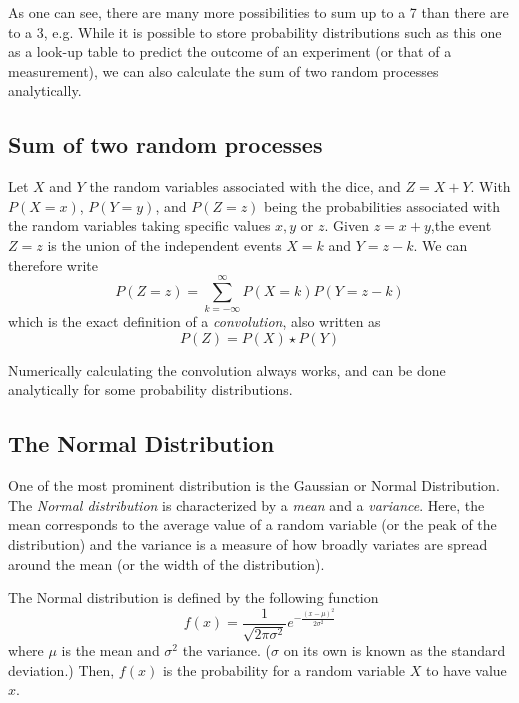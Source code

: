 As one can see, there are many more possibilities to sum up to a 7 than there are to a 3, e.g. While it is possible to store probability distributions such as this one as a look-up table to predict the outcome of an experiment (or that of a measurement), we can also calculate the sum of two random processes analytically. 

\subsection{Sum of two random processes}\label{sec:convolution}
Let $X$ and $Y$ the random variables associated with the dice, and $Z=X+Y$. With $P(X=x)$, $P(Y=y)$, and $P(Z=z)$ being the probabilities associated with the random variables taking specific values $x,y$ or $z$. Given $z=x+y$,the event $Z=z$ is the union of the independent events $X=k$ and $Y=z-k$. We can therefore write
\begin{equation}
P(Z=z)=\sum_{k=-\infty}^{\infty}P(X=k)P(Y=z-k)
\end{equation}
which is the exact definition of a \emph{convolution}, also written as 
\begin{equation}
P(Z)=P(X)\star P(Y)
\end{equation}

Numerically calculating the convolution always works, and can be done analytically for some probability distributions. 

\subsection{The Normal Distribution}
One of the most prominent distribution is the Gaussian or Normal Distribution. The \emph{Normal distribution} is characterized by a \emph{mean} and a \emph{variance}. Here, the mean corresponds to the average value of a random variable (or the peak of the distribution) and the variance is a measure of how broadly variates are spread around the mean (or the width of the distribution).

 The Normal distribution is defined by the following function
 \begin{equation}
f(x)=\frac{1}{\sqrt{2\pi\sigma^2}}e^{-\frac{(x-\mu)^2}{2\sigma^2}}
\end{equation}
where $ \mu$ is the mean and $ \sigma^2$ the variance. ($ \sigma$ on its own is known as the standard deviation.) Then, $ f(x)$ is the probability for a random variable $ X$ to have value $ x$.

